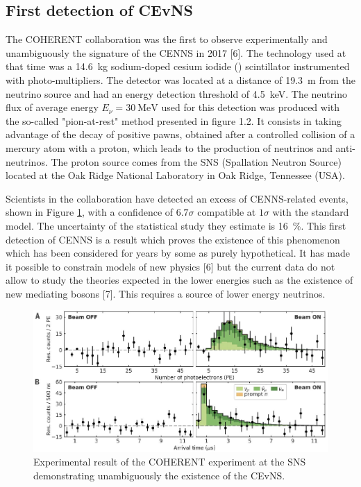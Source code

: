 \subsection{First detection of CEvNS}

The COHERENT collaboration was the first to observe experimentally and unambiguously the signature of the CENNS in 2017 [6]. The technology used at that time was a \SI{14.6}{\kg} sodium-doped cesium iodide () scintillator instrumented with photo-multipliers. The detector was located at a distance of \SI{19.3}{\m} from the neutrino source and had an energy detection threshold of \SI{4.5}{\kilo\eV}. The neutrino flux of average energy $E_{\nu} = \SI{30}{\mega\eV}$ used for this detection was produced with the so-called "pion-at-rest" method presented in figure 1.2. It consists in taking advantage of the decay of positive pawns, obtained after a controlled collision of a mercury atom with a proton, which leads to the production of neutrinos and anti-neutrinos. The proton source comes from the SNS (Spallation Neutron Source) located at the Oak Ridge National Laboratory in Oak Ridge, Tennessee (USA). 

Scientists in the collaboration have detected an excess of CENNS-related events, shown in Figure \ref{fig:coherent-result}, with a confidence of $6.7\sigma$ compatible at $1\sigma$ with the standard model. The uncertainty of the statistical study they estimate is \SI{16}{\percent}. This first detection of CENNS is a result which proves the existence of this phenomenon which has been considered for years by some as purely hypothetical. It has made it possible to constrain models of new physics [6] but the current data do not allow to study the theories expected in the lower energies such as the existence of new mediating bosons [7]. This requires a source of lower energy neutrinos.

\begin{figure}
\centering
\includegraphics [scale=1]{Figures/Introduction/coherent_result.pdf}
\caption{Experimental result of the COHERENT experiment at the SNS demonstrating unambiguously
the existence of the CEvNS.}
\label{fig:coherent-result}
\end{figure}


